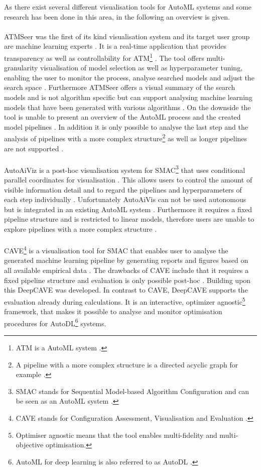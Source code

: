 As there exist several different visualisation tools for AutoML systems and some research has been done in this area, in the following an overview is given.
\\ \\
ATMSeer \cite{atmseer} was the first of its kind visualisation system \cite{trustautoml} and its target user group are machine learning experts \cite{atmseer}. It is a real-time application that provides transparency as well as controllability for ATM\footnote{ATM is a AutoML system \cite{xautoml}.} \cite{xautoml}. The tool offers multi-granularity visualisation of model selection as well as hyperparameter tuning, enabling the user to monitor the process, analyse searched models and adjust the search space \cite{aiviz, trustautoml, atmseer, hypertendril}. Furthermore ATMSeer offers a visual summary of the search models and is not algorithm specific but can support analysing machine learning models that have been generated with various algorithms \cite{atmseer}. On the downside the tool is unable to present an overview of the AutoML process and the created model pipelines \cite{trustautoml}. In addition it is only possible to analyse the last step and the analysis of pipelines with a more complex structure\footnote{A pipeline with a more complex structure is a directed acyclic graph for example \cite{pipelineprof}.} as well as longer pipelines are not supported \cite{pipelineprof}.
\\ \\
AutoAiViz \cite{aiviz} is a post-hoc visualisation system for SMAC\footnote{SMAC stands for Sequential Model-based Algorithm Configuration and can be seen as an AutoML system \cite{smac}.} that uses conditional parallel coordinates for visualisation \cite{xautoml, hypertendril}. This allows users to control the amount of visible information detail and to regard the pipelines and hyperparameters of each step individually \cite{aiviz, pipelineprof}. Unfortunately AutoAiVis can not be used autonomous but is integrated in an existing AutoML system \cite{aiviz}. Furthermore it requires a fixed pipeline structure \cite{xautoml} and is restricted to linear models, therefore users are unable to explore pipelines with a more complex structure \cite{pipelineprof}.
\\ \\
CAVE\footnote{CAVE stands for Configuration Assessment, Visualisation and Evaluation \cite{cave}.} \cite{cave} is a visualisation tool for SMAC that enables user to analyse the generated machine learning pipeline by generating reports and figures based on all available empirical data \cite{xautoml, cave}. The drawbacks of CAVE include that it requires a fixed pipeline structure and evaluation is only possible post-hoc \cite{xautoml}. Building upon this DeepCAVE \cite{deepcave} was developed. In contrast to CAVE, DeepCAVE supports the evaluation already during calculations. It is an interactive, optimizer agnostic\footnote{Optimiser agnostic means that the tool enables multi-fidelity and multi-objective optimisation.} framework, that makes it possible to analyse and monitor optimisation procedures for AutoDL\footnote{AutoML for deep learning is also referred to as AutoDL \cite{deepcave}.} systems\cite{deepcave}.
